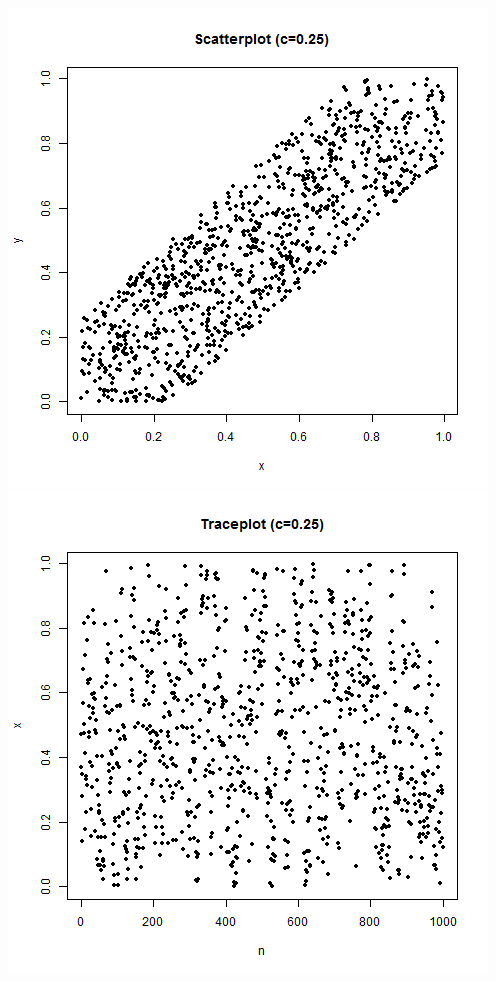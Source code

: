 \documentclass{article}
\begin{document}
\begin{enumerate}
\begin{enumerate}
\includegraphics[scale=0.4]{scat_025.png}
\includegraphics[scale=0.4]{trace_025.png} \\


\end{enumerate}
\end{enumerate}
\end{document}
